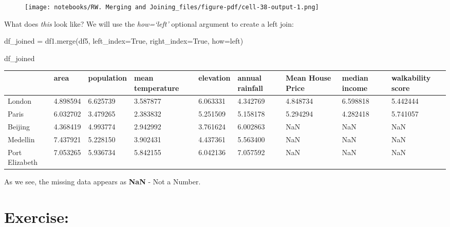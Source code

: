 \documentclass[
  letterpaper,
  DIV=11,
  numbers=noendperiod]{scrreprt}
\newenvironment{Shaded}{\begin{snugshade}}{\end{snugshade}}
\newcommand{\NormalTok}[1]{\textcolor[rgb]{0.00,0.23,0.31}{#1}}
\newcommand{\OperatorTok}[1]{\textcolor[rgb]{0.37,0.37,0.37}{#1}}
\newcommand{\StringTok}[1]{\textcolor[rgb]{0.13,0.47,0.30}{#1}}
\newcommand{\VariableTok}[1]{\textcolor[rgb]{0.07,0.07,0.07}{#1}}
\begin{document}
\begin{figure}[H]

{\centering \texttt{[image: notebooks/RW. Merging and Joining\_files/figure-pdf/cell-38-output-1.png]}

}

\end{figure}

What does \emph{this} look like? We will use the \emph{how=`left'}
optional argument to create a left join:

\begin{Shaded}
\begin{Highlighting}[]
\NormalTok{df\_joined }\OperatorTok{=}\NormalTok{ df1.merge(df5, left\_index}\OperatorTok{=}\VariableTok{True}\NormalTok{, right\_index}\OperatorTok{=}\VariableTok{True}\NormalTok{, how}\OperatorTok{=}\StringTok{\textquotesingle{}left\textquotesingle{}}\NormalTok{)}
\end{Highlighting}
\end{Shaded}

\begin{Shaded}
\begin{Highlighting}[]
\NormalTok{df\_joined}
\end{Highlighting}
\end{Shaded}

\begin{longtable}[]{@{}lllllllll@{}}
\toprule\noalign{}
& area & population & mean temperature & elevation & annual rainfall &
Mean House Price & median income & walkability score \\
\midrule\noalign{}
\endhead
\bottomrule\noalign{}
\endlastfoot
London & 4.898594 & 6.625739 & 3.587877 & 6.063331 & 4.342769 & 4.848734
& 6.598818 & 5.442444 \\
Paris & 6.032702 & 3.479265 & 2.383832 & 5.251509 & 5.158178 & 5.294294
& 4.282418 & 5.741057 \\
Beijing & 4.368419 & 4.993774 & 2.942992 & 3.761624 & 6.002863 & NaN &
NaN & NaN \\
Medellin & 7.437921 & 5.228150 & 3.902431 & 4.437361 & 5.563400 & NaN &
NaN & NaN \\
Port Elizabeth & 7.053265 & 5.936734 & 5.842155 & 6.042136 & 7.057592 &
NaN & NaN & NaN \\
\end{longtable}

As we see, the missing data appears as \textbf{NaN} - Not a Number.

\hypertarget{exercise-18}{%
\section{Exercise:}\label{exercise-18}}
\end{document}
